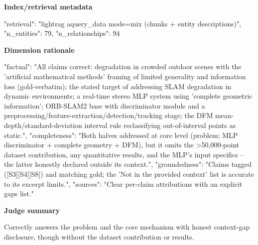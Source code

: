 \documentclass[10pt]{article}
\begin{document}
\textbf{Index/retrieval metadata}
\begin{EvidenceText}
{
  "retrieval": "lightrag aquery_data mode=mix (chunks + entity descriptions)",
  "n_entities": 79,
  "n_relationships": 94
}
\end{EvidenceText}

\textbf{Dimension rationale}
\begin{EvidenceText}
{
  "factual": "All claims correct: degradation in crowded outdoor scenes with the 'artificial mathematical methods' framing of limited generality and information loss (gold-verbatim); the stated target of addressing SLAM degradation in dynamic environments; a real-time stereo MLP system using 'complete geometric information'; ORB-SLAM2 base with discriminator module and a preprocessing/feature-extraction/detection/tracking stage; the DFM mean-depth/standard-deviation interval rule reclassifying out-of-interval points as static.",
  "completeness": "Both halves addressed at core level (problem; MLP discriminator + complete geometry + DFM), but it omits the >50,000-point dataset contribution, any quantitative results, and the MLP's input specifics -- the latter honestly declared outside its context.",
  "groundedness": "Claims tagged ([S3][S4][S8]) and matching gold; the 'Not in the provided context' list is accurate to its excerpt limits.",
  "sources": "Clear per-claim attributions with an explicit gaps list."
}
\end{EvidenceText}

\textbf{Judge summary}
\begin{EvidenceText}
Correctly answers the problem and the core mechanism with honest context-gap disclosure, though without the dataset contribution or results.
\end{EvidenceText}
\end{document}
